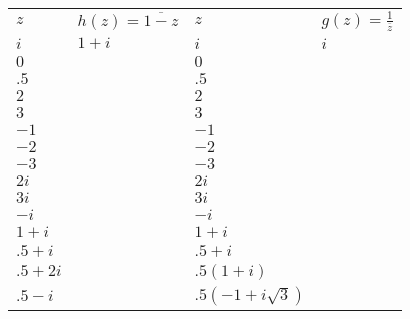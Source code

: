 \documentclass[../gatm.tex]{subfiles}
\begin{document}
\begin{figure}[h]
\begin{minipage}{0.5\textwidth}
\centering
\renewcommand{\arraystretch}{1.4}
\begin{tabular}{|l|l|l|l|}
\hline
$z$               & $h(z)=\overline{1-z}$ & $z$                      & $g(z)=\frac{1}{\overline{z}}$ \\ \hhline{|=|=|=|=|}
$i$               & $1+i$                 & $i$                      & $i$                           \\ \hline
$0$               &                     & $0$                      &                             \\ \hline
$.5$              &                     & $.5$                     &                             \\ \hline
$2$               &                     & $2$                      &                             \\ \hline
$3$               &                     & $3$                      &                             \\ \hline
$-1$              &                     & $-1$                     &                             \\ \hline
$-2$              &                     & $-2$                     &                             \\ \hline
$-3$              &                     & $-3$                     &                             \\ \hline
$2i$              &                     & $2i$                     &                             \\ \hline
$3i$              &                     & $3i$                     &                             \\ \hline
$-i$              &                     & $-i$                     &                             \\ \hline
$1+i$             &                     & $1+i$                    &                             \\ \hline
$.5+i$            &                     & $.5+i$                   &                             \\ \hline
$.5+2i$           &                     & $.5(1+i)$                &                             \\ \hline
$.5-i$            &                     & $.5(-1+i\sqrt{3})$       &                             \\ \hline

\end{tabular}
\end{minipage}
\end{figure}
\end{document}
